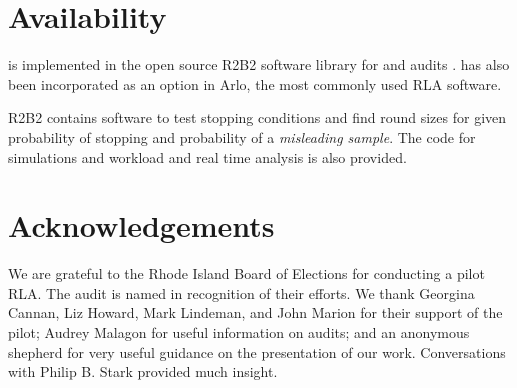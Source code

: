 \section{Availability}
\label{sec:avail}
\Providence is implemented in the open source R2B2 software library for \R and \B audits \cite{r2b2}.
\Providence has also been incorporated as an option in Arlo, the most commonly used RLA software.

R2B2 contains software to test stopping conditions and find round sizes for given probability of stopping and probability of a \emph{misleading sample}. The code for simulations and workload and real time analysis is also provided.

\section{Acknowledgements}
\label{sec:ack}
We are grateful to the Rhode Island Board of Elections for conducting a pilot \Providence RLA. The audit is named in recognition of their efforts. We thank Georgina Cannan, Liz Howard, Mark Lindeman, and John Marion for their support of the pilot; Audrey Malagon for useful information on audits; and an anonymous shepherd for very useful guidance on the presentation of our work. Conversations with Philip B. Stark provided much insight. 
%
%
%
